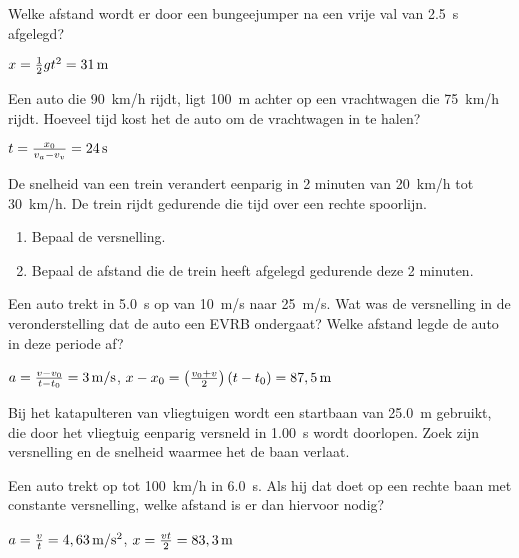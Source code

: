 \documentclass{ximera}
\begin{document}
\begin{exercise}
    Welke afstand wordt er door een bungeejumper na een vrije val van \SI{2,5}{s} afgelegd?
    \begin{oplossing}
        $x=\frac{1}{2}gt^2=31\rm\,m$
    \end{oplossing}
\end{exercise}

\begin{exercise}
    Een auto die \SI{90}{km/h} rijdt, ligt \SI{100}{m} achter op een vrachtwagen die \SI{75}{km/h} rijdt. Hoeveel tijd kost het de auto om de vrachtwagen in te halen? 
    \begin{oplossing}
        $t=\frac{x_0}{v_a-v_v}=24\rm\,s$
    \end{oplossing}
\end{exercise}

\begin{exercise}
    De snelheid van een trein verandert eenparig in 2 minuten van \SI{20}{km/h} tot \SI{30}{km/h}. De trein rijdt gedurende die tijd over een rechte spoorlijn.
    \begin{enumerate}
        \item Bepaal de versnelling.
        \item Bepaal de afstand die de trein heeft afgelegd gedurende deze 2 minuten.
    \end{enumerate}
\end{exercise}

\begin{exercise}
    Een auto trekt in \SI{5,0}{s} op van \SI{10}{m/s} naar \SI{25}{m/s}. Wat was de versnelling in de veronderstelling dat de auto een EVRB ondergaat? Welke afstand legde de auto in deze periode af?
    \begin{oplossing}
        $a=\frac{v-v_0}{t-t_0}=3\rm\,m/s$,
        $x-x_0=\left(\frac{v_0+v}{2}\right)(t-t_0)=87,5\rm\,m$
    \end{oplossing}
\end{exercise}

\begin{exercise}
    Bij het katapulteren van vliegtuigen wordt een startbaan van \SI{25,0}{m} gebruikt, die door het vliegtuig eenparig versneld in \SI{1,00}{s} wordt doorlopen. Zoek zijn versnelling en de snelheid waarmee het de baan verlaat.
\end{exercise}

\begin{exercise}
    Een auto trekt op tot \SI{100}{km/h} in \SI{6,0}{s}. Als hij dat doet op een rechte baan met constante versnelling, welke afstand is er dan hiervoor nodig?
    \begin{oplossing}
        $a=\frac{v}{t}=4,63\rm\,m/s^2$, $x=\frac{vt}{2}=83,3\rm\,m$
    \end{oplossing}
\end{exercise}
\end{document}
